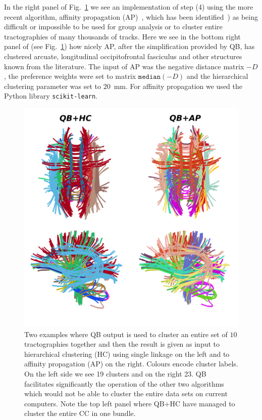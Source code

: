 \documentclass[journal]{IEEEtran}
\begin{document}
In the right panel of Fig.~\ref{Flo:LSC+HC+AP} we see an implementation
of step (4) using the more recent algorithm, affinity propagation
(AP)~\cite{dueck2009affinity}, which has been
identified~\cite{malcolm2009filtered}) as being difficult or impossible
to be used for group analysis or to cluster entire tractographies of
many thousands of tracks.
Here we see in the bottom right panel of (see Fig.~\ref{Flo:LSC+HC+AP})
how nicely AP, after the simplification provided by QB, has clustered
arcuate, longitudinal occipitofrontal fasciculus and other structures
known from the literature. The input of AP was the negative distance
matrix $-D$, the preference weights were set to matrix $\mathtt{median}(-D)$
and the hierarchical clustering parameter was set to $20$~mm.
For affinity propagation we used the Python library \texttt{scikit-learn}.

\begin{figure}
\begin{centering}
\includegraphics[scale=0.6]{Fig_8_QB_with_others}
\par\end{centering}
\caption{Two examples where QB output is used to cluster an entire set
  of $10$ tractographies together and then the result is given as input
  to hierarchical clustering (HC) using single linkage on the left and
  to affinity propagation (AP) on the right. Colours encode cluster
  labels. On the left side we see 19 clusters and on the right 23. QB
  facilitates significantly the operation of the other two algorithms
  which would not be able to cluster the entire data sets on current
  computers. Note the top left panel where QB+HC have managed to cluster
  the entire CC in one bundle.\label{Flo:LSC+HC+AP}}
\end{figure}
\end{document}
